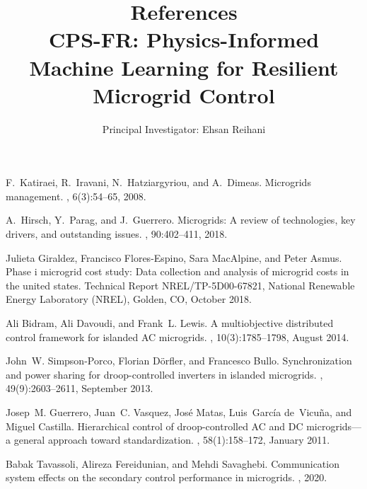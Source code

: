 \documentclass[12pt]{article}
\begin{document}
\title{\Large\textbf{References\\CPS-FR: Physics-Informed Machine Learning for Resilient Microgrid Control}}
\author{Principal Investigator: Ehsan Reihani}
\date{}

\maketitle

\begin{thebibliography}{10}

F.~Katiraei, R.~Iravani, N.~Hatziargyriou, and A.~Dimeas.
\newblock Microgrids management.
, 6(3):54--65, 2008.

A.~Hirsch, Y.~Parag, and J.~Guerrero.
\newblock Microgrids: A review of technologies, key drivers, and outstanding
  issues.
, 90:402--411, 2018.

Julieta Giraldez, Francisco Flores-Espino, Sara MacAlpine, and Peter Asmus.
\newblock Phase i microgrid cost study: Data collection and analysis of
  microgrid costs in the united states.
\newblock Technical Report NREL/TP-5D00-67821, National Renewable Energy
  Laboratory (NREL), Golden, CO, October 2018.

Ali Bidram, Ali Davoudi, and Frank~L. Lewis.
\newblock A multiobjective distributed control framework for islanded {AC}
  microgrids.
, 10(3):1785--1798,
  August 2014.

John~W. Simpson-Porco, Florian D\"{o}rfler, and Francesco Bullo.
\newblock Synchronization and power sharing for droop-controlled inverters in
  islanded microgrids.
, 49(9):2603--2611, September 2013.

Josep~M. Guerrero, Juan~C. Vasquez, Jos\'{e} Matas, Luis~Garc\'{i}a
  de~Vicu\~{n}a, and Miguel Castilla.
\newblock Hierarchical control of droop-controlled {AC} and {DC} microgrids---a
  general approach toward standardization.
, 58(1):158--172,
  January 2011.

Babak Tavassoli, Alireza Fereidunian, and Mehdi Savaghebi.
\newblock Communication system effects on the secondary control performance in
  microgrids.
, 2020.


\end{thebibliography}
\end{document}
